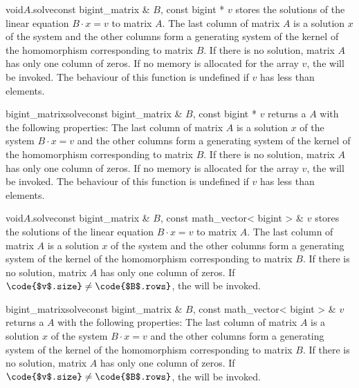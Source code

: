{\begin{fcode}{void}{$A$.solve}{const bigint_matrix & $B$, const bigint * $v$}
  stores the solutions of the linear equation $B \cdot x = v$ to matrix $A$.  The last column of
  matrix $A$ is a solution $x$ of the system and the other columns form a generating system of
  the kernel of the homomorphism corresponding to matrix $B$.  If there is no solution, matrix
  $A$ has only one column of zeros.  If no memory is allocated for the array $v$, the \LEH will
  be invoked.  The behaviour of this function is undefined if $v$ has less than 
  elements.
\end{fcode}

\begin{fcode}{bigint_matrix}{solve}{const bigint_matrix & $B$, const bigint * $v$}
  returns a  $A$ with the following properties: The last column of matrix
  $A$ is a solution $x$ of the system $B \cdot x = v$ and the other columns form a generating
  system of the kernel of the homomorphism corresponding to matrix $B$.  If there is no
  solution, matrix $A$ has only one column of zeros.  If no memory is allocated for the array
  $v$, the \LEH will be invoked.  The behaviour of this function is undefined if $v$ has less
  than  elements.
\end{fcode}

\begin{fcode}{void}{$A$.solve}{const bigint_matrix & $B$, const math_vector< bigint > & $v$}
  stores the solutions of the linear equation $B \cdot x = v$ to matrix $A$.  The last column of
  matrix $A$ is a solution $x$ of the system and the other columns form a generating system of
  the kernel of the homomorphism corresponding to matrix $B$.  If there is no solution, matrix
  $A$ has only one column of zeros.  If $\code{$v$.size} \neq \code{$B$.rows}$, the \LEH will be
  invoked.
\end{fcode}

\begin{fcode}{bigint_matrix}{solve}{const bigint_matrix & $B$, const math_vector< bigint > & $v$}
  returns a  $A$ with the following properties: The last column of matrix
  $A$ is a solution $x$ of the system $B \cdot x = v$ and the other columns form a generating
  system of the kernel of the homomorphism corresponding to matrix $B$.  If there is no
  solution, matrix $A$ has only one column of zeros.  If $\code{$v$.size} \neq \code{$B$.rows}$,
  the \LEH will be invoked.
\end{fcode}

}
